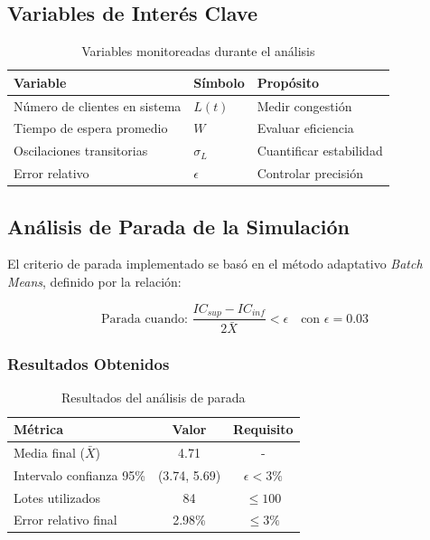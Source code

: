 \documentclass[12pt, a4paper]{article}
\begin{document}
    \subsection{Variables de Interés Clave}
    \begin{table}[H]
    	\centering
    	\caption{Variables monitoreadas durante el análisis}
    	\label{tab:variables-interes}
    	\begin{tabular}{lll}
    		\toprule
    		\textbf{Variable} & \textbf{Símbolo} & \textbf{Propósito} \\
    		\midrule
    		Número de clientes en sistema & $L(t)$ & Medir congestión \\
    		Tiempo de espera promedio & $W$ & Evaluar eficiencia \\
    		Oscilaciones transitorias & $\sigma_L$ & Cuantificar estabilidad \\
    		Error relativo & $\epsilon$ & Controlar precisión \\
    		\bottomrule
    	\end{tabular}
    \end{table}
    
    \subsection{Análisis de Parada de la Simulación}
    El criterio de parada implementado se basó en el método adaptativo \textit{Batch Means}, definido por la relación:
    
    \begin{equation}
    	\text{Parada cuando: } \frac{IC_{sup} - IC_{inf}}{2\bar{X}} < \epsilon \quad \text{con } \epsilon = 0.03
    \end{equation}
    
    \subsubsection{Resultados Obtenidos}
    \begin{table}[H]
    	\centering
    	\caption{Resultados del análisis de parada}
    	\label{tab:resultados-parada}
    	\begin{tabular}{lcc}
    		\toprule
    		\textbf{Métrica} & \textbf{Valor} & \textbf{Requisito} \\
    		\midrule
    		Media final ($\bar{X}$) & 4.71 & - \\
    		Intervalo confianza 95\% & (3.74, 5.69) & $\epsilon < 3\%$ \\
    		Lotes utilizados & 84 & $\leq 100$ \\
    		Error relativo final & 2.98\% & $\leq 3\%$ \\
    		\bottomrule
    	\end{tabular}
    \end{table}
    
\end{document}

